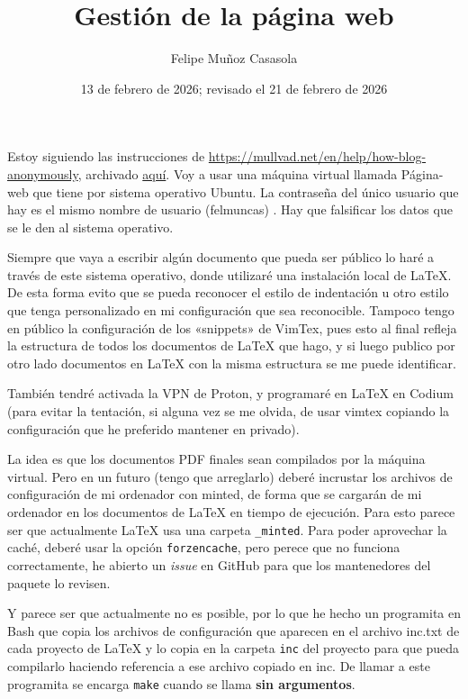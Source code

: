 \documentclass{article}
\title{Gestión de la página web}
\author{Felipe Muñoz Casasola}
\date{13 de febrero de 2026; revisado el 21 de febrero de 2026}
\begin{document}
    Estoy siguiendo las instrucciones de
    \href{https://mullvad.net/en/help/how-blog-anonymously}{https://mullvad.net/en/help/how-blog-anonymously},
    archivado
    \href{https://web.archive.org/web/20260102025718/https://mullvad.net/en/help/how-blog-anonymously}{aquí}.
    Voy a usar una máquina virtual llamada Página-web que tiene por sistema
    operativo Ubuntu. La contraseña del único usuario que hay es el mismo
    nombre de usuario (felmuncas) . Hay que falsificar los datos que se le den
    al sistema operativo.

    Siempre que vaya a escribir algún documento que pueda ser público lo haré a
    través de este sistema operativo, donde utilizaré una instalación local de
    \LaTeX{}. De esta forma evito que se pueda reconocer el estilo de
    indentación u otro estilo que tenga personalizado en mi configuración que
    sea reconocible. Tampoco tengo en público la configuración de los «snippets»
    de VimTex, pues esto al final refleja la estructura de todos los documentos
    de \LaTeX{} que hago, y si luego publico por otro lado documentos en
    \LaTeX{} con la misma estructura se me puede identificar.

    También tendré activada la VPN de Proton, y programaré en \LaTeX{} en
    Codium (para evitar la tentación, si alguna vez se me olvida, de
    usar vimtex copiando la configuración que he preferido mantener en privado).

    La idea es que los documentos PDF finales sean compilados por la máquina virtual.
    Pero en un futuro (tengo que arreglarlo) deberé incrustar los archivos de configuración
    de mi ordenador con minted, de forma que se cargarán de mi ordenador en los
    documentos de \LaTeX{} en tiempo de ejecución. Para esto parece ser que
    actualmente \LaTeX{} usa una carpeta \texttt{\_minted}. Para poder
    aprovechar la caché, deberé usar la opción \texttt{forzencache}, pero
    perece que no funciona correctamente, he abierto un \textit{issue} en
    GitHub para que los mantenedores del paquete lo revisen.
    
    Y parece ser
    que actualmente no es posible, por lo que he hecho un programita en Bash
    que copia los archivos de configuración que aparecen en el archivo inc.txt
    de cada proyecto de \LaTeX{} y lo copia en la carpeta \texttt{inc} del
    proyecto para que pueda compilarlo haciendo referencia a ese archivo
    copiado en inc. De llamar a este programita se encarga \texttt{make} cuando
    se llama \textbf{sin argumentos}.
    
\end{document}
